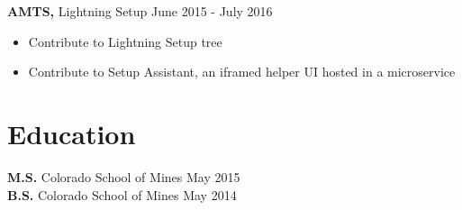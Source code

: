 \documentclass[12pt]{res}
\begin{document}
\begin{resume}
{\bf AMTS,} Lightning Setup \hfill June 2015 - July 2016
\begin{itemize} \itemsep -2pt
    \item Contribute to Lightning Setup tree
    \item Contribute to Setup Assistant, an iframed helper UI hosted in a microservice
\end{itemize}

\section{Education}

{\bf M.S.} Colorado School of Mines \hfill May 2015 \\
{\bf B.S.} Colorado School of Mines \hfill May 2014





\end{resume}
\end{document}

